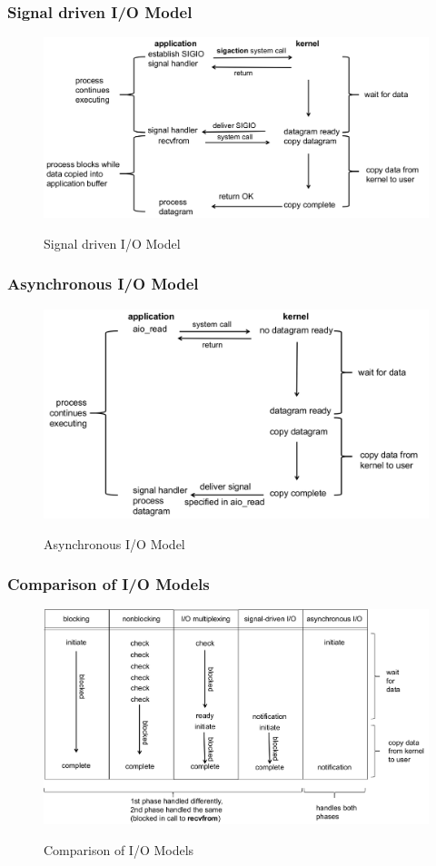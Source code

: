 \documentclass[notes,serif]{beamer}
\begin{document}
\begin{frame}
\frametitle{Signal driven I/O Model}
  \begin{figure}
  \centering
  \includegraphics[width=.8\textwidth]{fig/03fig04.png}\\
  \caption{Signal driven I/O Model}
  \label{4}
  \end{figure}
\end{frame}

\begin{frame}
\frametitle{Asynchronous I/O Model}
  \begin{figure}
  \centering
  \includegraphics[width=.8\textwidth]{fig/03fig05.png}\\
  \caption{Asynchronous I/O Model}
  \label{5}
  \end{figure}
\end{frame}

\begin{frame}
\frametitle{Comparison of I/O Models}
  \begin{figure}
  \centering
  \includegraphics[width=.8\textwidth]{fig/03fig06.png}\\
  \caption{Comparison of I/O Models}
  \label{6}
  \end{figure}
\end{frame}
\end{document}
